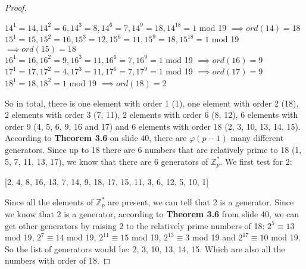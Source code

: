\documentclass[a4paper]{article}
\begin{document}
\begin{proof}
\begin{center}
$14^1 = 14, 14^2 = 6, 14^3 = 8, 14^6 = 7, 14^9 = 18, 14^{18} = 1$ mod 19 $\implies ord(14) = 18$\\
$15^1 = 15, 15^2 = 16, 15^3 = 12, 15^6 = 11, 15^9 = 18, 15^{18} = 1$ mod 19 $\implies ord(15) = 18$\\
$16^1 = 16, 16^2 = 9, 16^3 = 11, 16^6 = 7, 16^9 = 1$ mod 19 $\implies ord(16) = 9$\\
$17^1 = 17, 17^2 = 4, 17^3 = 11, 17^6 = 7, 17^9 = 1$ mod 19 $\implies ord(17) = 9$\\
$18^1 = 18, 18^2 = 1$ mod 19 $\implies ord(18) = 2$\\
\end{center}
So in total, there is one element with order 1 (1), one element with order 2 (18), 2 elements with order 3 (7, 11), 2 elements with order 6 (8, 12), 6 elements with order 9 (4, 5, 6, 9, 16 and 17) and 6 elements with order 18 (2, 3, 10, 13, 14, 15).
According to \textbf{Theorem 3.6} on slide 40, there are $\varphi(p - 1)$ many different generators. Since up to 18 there are 6 numbers that are relatively prime to 18 (1, 5, 7, 11, 13, 17), we know that there are 6 generators of $\mathbb{Z}^{*}_{p}$. We first test for 2:
\begin{center}
[2, 4, 8, 16, 13, 7, 14, 9, 18, 17, 15, 11, 3, 6, 12, 5, 10, 1]
\end{center}
 Since all the elements of $\mathbb{Z}^{*}_{p}$ are present, we can tell that 2 is a generator. Since we know that 2 is a generator, according to \textbf{Theorem 3.6} from slide 40, we can get other generators by raising 2 to the relatively prime numbers of 18:  $2^{5} \equiv 13$ mod 19, $2^{7} \equiv 14$ mod 19, $2^{11} \equiv 15$ mod 19, $2^{13} \equiv 3$ mod 19 and $2^{17} \equiv 10$ mod 19. So the list of generators would be: 2, 3, 10, 13, 14, 15. Which are also all the numbers with order of 18.
\end{proof}
\end{document}
